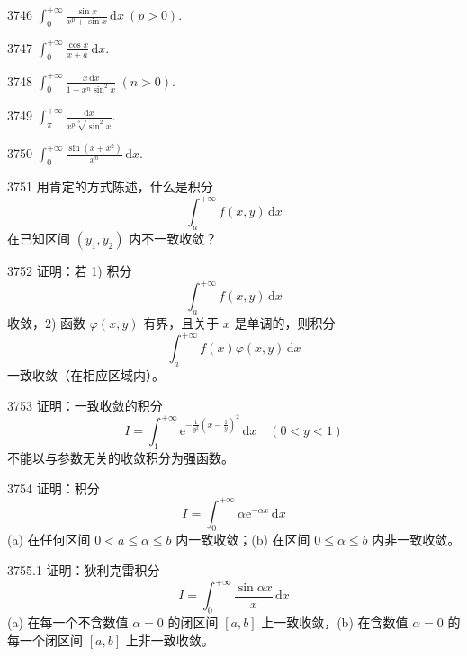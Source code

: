 \begin{prob}[S]{3746}
$\int_{0}^{+\infty} \frac{\sin x}{x^p + \sin x}\,\mathrm{d}x \ (p > 0)$.
\end{prob}


\begin{prob}[S]{3747}
$\int_{0}^{+\infty} \frac{\cos x}{x+a}\,\mathrm{d}x$.
\end{prob}

\begin{prob}[S]{3748}
$\int_{0}^{+\infty} \frac{x\,\mathrm{d}x}{1 + x^n \sin^2 x} \ (n > 0)$.
\end{prob}

\begin{prob}[S]{3749}
$\int_{\pi}^{+\infty} \frac{\mathrm{d}x}{x^p \sqrt[3]{\sin^2 x}}$.
\end{prob}

\begin{prob}[S]{3750}
$\int_{0}^{+\infty} \frac{\sin(x+x^2)}{x^n}\,\mathrm{d}x$.
\end{prob}

\begin{prob}[M]{3751}
用肯定的方式陈述，什么是积分
\[
\int_{a}^{+\infty} f(x, y)\,\mathrm{d}x
\]
在已知区间 $(y_1, y_2)$ 内不一致收敛？
\end{prob}

\begin{prob}[M]{3752}
证明：若 1) 积分
\[
\int_{a}^{+\infty} f(x, y)\,\mathrm{d}x
\]
收敛，2) 函数 $\varphi(x, y)$ 有界，且关于 $x$ 是单调的，则积分
\[
\int_{a}^{+\infty} f(x)\varphi(x, y)\,\mathrm{d}x
\]
一致收敛（在相应区域内）。
\end{prob}

\begin{prob}[M]{3753}
证明：一致收敛的积分
\[
I = \int_{1}^{+\infty} \mathrm{e}^{-\frac{1}{y^2}\left(x-\frac{1}{y}\right)^2}\,\mathrm{d}x \quad (0 < y < 1)
\]
不能以与参数无关的收敛积分为强函数。
\end{prob}

\begin{prob}[M]{3754}
证明：积分
\[
I = \int_{0}^{+\infty} \alpha \mathrm{e}^{-\alpha x}\,\mathrm{d}x
\]
(a) 在任何区间 $0 < a \leqslant \alpha \leqslant b$ 内一致收敛；(b) 在区间 $0 \leqslant \alpha \leqslant b$ 内非一致收敛。
\end{prob}

\begin{prob}[M]{3755.1}
证明：狄利克雷积分
\[
I = \int_{0}^{+\infty} \frac{\sin \alpha x}{x}\,\mathrm{d}x
\]
(a) 在每一个不含数值 $\alpha = 0$ 的闭区间 $[a, b]$ 上一致收敛，(b) 在含数值 $\alpha = 0$ 的每一个闭区间 $[a, b]$ 上非一致收敛。
\end{prob}

